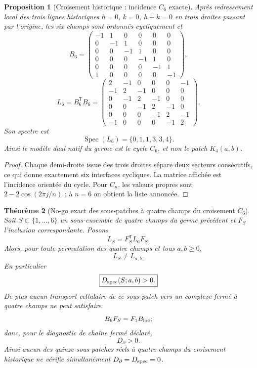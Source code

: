 \documentclass[11pt,a4paper]{article}
\newtheorem{theorem}{Théorème}[section]
\newtheorem{proposition}[theorem]{Proposition}
\begin{document}
\begin{proposition}[Croisement historique : incidence $C_6$ exacte]\label{prop:selling-X6}
Après redressement local des trois lignes historiques $h=0$, $k=0$, $h+k=0$ en trois droites passant par l'origine, les six champs sont ordonnés cycliquement et
\[
B_6=\begin{pmatrix}
-1&1&0&0&0&0\\
0&-1&1&0&0&0\\
0&0&-1&1&0&0\\
0&0&0&-1&1&0\\
0&0&0&0&-1&1\\
1&0&0&0&0&-1
\end{pmatrix},
\]
\[
L_6=B_6^{\mathsf T}B_6=
\begin{pmatrix}
2&-1&0&0&0&-1\\
-1&2&-1&0&0&0\\
0&-1&2&-1&0&0\\
0&0&-1&2&-1&0\\
0&0&0&-1&2&-1\\
-1&0&0&0&-1&2
\end{pmatrix}.
\]
Son spectre est
\[
 \operatorname{Spec}(L_6)=\{0,1,1,3,3,4\}.
\]
Ainsi le modèle dual natif du germe est le cycle $C_6$, et non le patch $K_4(a,b)$.
\end{proposition}

\begin{proof}
Chaque demi-droite issue des trois droites sépare deux secteurs consécutifs, ce qui donne exactement six interfaces cycliques. La matrice affichée est l'incidence orientée du cycle. Pour $C_n$, les valeurs propres sont $2-2\cos(2\pi j/n)$ ; à $n=6$ on obtient la liste annoncée.
\end{proof}

\begin{theorem}[No-go exact des sous-patches à quatre champs du croisement $C_6$]\label{thm:X6-noK4}
Soit $S\subset\{1,\ldots,6\}$ un sous-ensemble de quatre champs du germe précédent et $F_S$ l'inclusion correspondante. Posons
\[
 L_S=F_S^{\mathsf T}L_6F_S.
\]
Alors, pour toute permutation des quatre champs et tous $a,b\ge0$,
\[
 L_S\ne L_{a,b}.
\]
En particulier
\[
 \boxed{D_{\rm spec}(S;a,b)>0.}
\]
De plus aucun transport cellulaire de ce sous-patch vers un complexe fermé à quatre champs ne peut satisfaire
\[
 B_6F_S=F_1B_{\rm loc};
\]
donc, pour le diagnostic de chaîne fermé déclaré,
\[
 \boxed{D_\partial>0.}
\]
Ainsi aucun des quinze sous-patches réels à quatre champs du croisement historique ne vérifie simultanément $D_\partial=D_{\rm spec}=0$.
\end{theorem}
\end{document}
